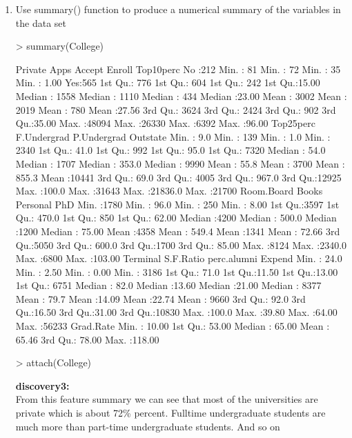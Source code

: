 \documentclass[a4paper]{article}
\begin{document}
\begin{enumerate}
\item Use summary() function to produce a numerical summary of the variables in the data set
\begin{Schunk}
\begin{Sinput}
> summary(College)
\end{Sinput}
\begin{Soutput}
 Private        Apps           Accept          Enroll       Top10perc    
 No :212   Min.   :   81   Min.   :   72   Min.   :  35   Min.   : 1.00  
 Yes:565   1st Qu.:  776   1st Qu.:  604   1st Qu.: 242   1st Qu.:15.00  
           Median : 1558   Median : 1110   Median : 434   Median :23.00  
           Mean   : 3002   Mean   : 2019   Mean   : 780   Mean   :27.56  
           3rd Qu.: 3624   3rd Qu.: 2424   3rd Qu.: 902   3rd Qu.:35.00  
           Max.   :48094   Max.   :26330   Max.   :6392   Max.   :96.00  
   Top25perc      F.Undergrad     P.Undergrad         Outstate    
 Min.   :  9.0   Min.   :  139   Min.   :    1.0   Min.   : 2340  
 1st Qu.: 41.0   1st Qu.:  992   1st Qu.:   95.0   1st Qu.: 7320  
 Median : 54.0   Median : 1707   Median :  353.0   Median : 9990  
 Mean   : 55.8   Mean   : 3700   Mean   :  855.3   Mean   :10441  
 3rd Qu.: 69.0   3rd Qu.: 4005   3rd Qu.:  967.0   3rd Qu.:12925  
 Max.   :100.0   Max.   :31643   Max.   :21836.0   Max.   :21700  
   Room.Board       Books           Personal         PhD        
 Min.   :1780   Min.   :  96.0   Min.   : 250   Min.   :  8.00  
 1st Qu.:3597   1st Qu.: 470.0   1st Qu.: 850   1st Qu.: 62.00  
 Median :4200   Median : 500.0   Median :1200   Median : 75.00  
 Mean   :4358   Mean   : 549.4   Mean   :1341   Mean   : 72.66  
 3rd Qu.:5050   3rd Qu.: 600.0   3rd Qu.:1700   3rd Qu.: 85.00  
 Max.   :8124   Max.   :2340.0   Max.   :6800   Max.   :103.00  
    Terminal       S.F.Ratio      perc.alumni        Expend     
 Min.   : 24.0   Min.   : 2.50   Min.   : 0.00   Min.   : 3186  
 1st Qu.: 71.0   1st Qu.:11.50   1st Qu.:13.00   1st Qu.: 6751  
 Median : 82.0   Median :13.60   Median :21.00   Median : 8377  
 Mean   : 79.7   Mean   :14.09   Mean   :22.74   Mean   : 9660  
 3rd Qu.: 92.0   3rd Qu.:16.50   3rd Qu.:31.00   3rd Qu.:10830  
 Max.   :100.0   Max.   :39.80   Max.   :64.00   Max.   :56233  
   Grad.Rate     
 Min.   : 10.00  
 1st Qu.: 53.00  
 Median : 65.00  
 Mean   : 65.46  
 3rd Qu.: 78.00  
 Max.   :118.00  
\end{Soutput}
\begin{Sinput}
> attach(College)
\end{Sinput}
\end{Schunk}
{
\colorbox{BurntOrange}{\textbf{discovery3:}} \color{red}\\
From this feature summary we can see that most of the universities are private which is about 72\% percent. Fulltime undergraduate students are much more than part-time undergraduate students. And so on
}



\end{enumerate}
\end{document}
